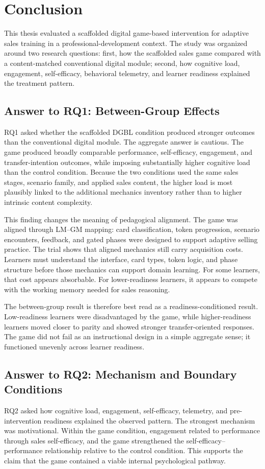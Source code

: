 \documentclass[12pt]{report}
\begin{document}
\chapter{Conclusion}
This thesis evaluated a scaffolded digital game-based intervention for adaptive sales training in a professional-development context. The study was organized around two research questions: first, how the scaffolded sales game compared with a content-matched conventional digital module; second, how cognitive load, engagement, self-efficacy, behavioral telemetry, and learner readiness explained the treatment pattern.

\section*{Answer to RQ1: Between-Group Effects}
RQ1 asked whether the scaffolded DGBL condition produced stronger outcomes than the conventional digital module. The aggregate answer is cautious. The game produced broadly comparable performance, self-efficacy, engagement, and transfer-intention outcomes, while imposing substantially higher cognitive load than the control condition. Because the two conditions used the same sales stages, scenario family, and applied sales content, the higher load is most plausibly linked to the additional mechanics inventory rather than to higher intrinsic content complexity.

This finding changes the meaning of pedagogical alignment. The game was aligned through LM--GM mapping: card classification, token progression, scenario encounters, feedback, and gated phases were designed to support adaptive selling practice. The trial shows that aligned mechanics still carry acquisition costs. Learners must understand the interface, card types, token logic, and phase structure before those mechanics can support domain learning. For some learners, that cost appears absorbable. For lower-readiness learners, it appears to compete with the working memory needed for sales reasoning.

The between-group result is therefore best read as a readiness-conditioned result. Low-readiness learners were disadvantaged by the game, while higher-readiness learners moved closer to parity and showed stronger transfer-oriented responses. The game did not fail as an instructional design in a simple aggregate sense; it functioned unevenly across learner readiness.

\section*{Answer to RQ2: Mechanism and Boundary Conditions}
RQ2 asked how cognitive load, engagement, self-efficacy, telemetry, and pre-intervention readiness explained the observed pattern. The strongest mechanism was motivational. Within the game condition, engagement related to performance through sales self-efficacy, and the game strengthened the self-efficacy--performance relationship relative to the control condition. This supports the claim that the game contained a viable internal psychological pathway.
\end{document}
